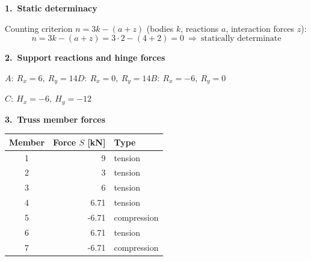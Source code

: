 \documentclass[a4paper,11pt]{article}
\begin{document}
\par\medskip\textbf{1.\ Static determinacy}\par Counting criterion $n=3k-(a+z)$ (bodies $k$, reactions $a$, interaction forces $z$):
\[ n=3k-(a+z)=3\cdot2-(4+2)=0\ \Rightarrow\ \text{statically determinate} \]
\par\medskip\textbf{2.\ Support reactions and hinge forces}\par
$A:\ R_x=6,\ R_y=14$\quad $D:\ R_x=0,\ R_y=14$\quad $B:\ R_x=-6,\ R_y=0$\par $C:\ H_x=-6,\ H_y=-12$
\par\medskip\textbf{3.\ Truss member forces}\par
\begin{center}\renewcommand{\arraystretch}{1.1}\begin{tabular}{c r l}
\toprule
Member & Force $S$ [kN] & Type \\
\midrule
  1 & 9 & tension \\
  2 & 3 & tension \\
  3 & 6 & tension \\
  4 & 6.71 & tension \\
  5 & -6.71 & compression \\
  6 & 6.71 & tension \\
  7 & -6.71 & compression \\
\bottomrule
\end{tabular}\end{center}
\end{document}

